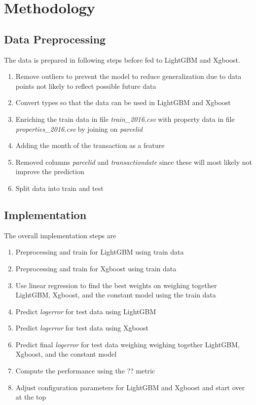 \documentclass[a4paper]{article}
\begin{document}
\section{Methodology}

\subsection{Data Preprocessing}
The data is prepared in following steps before fed to LightGBM and Xgboost.
\begin{enumerate}
    \item Remove outliers to prevent the model to reduce generalization due to data points not likely to
        reflect possible future data
    \item Convert types so that the data can be used in LightGBM and Xgboost
    \item Enriching the train data in file \textit{train\_2016.csv} with property data in file
        \textit{properties\_2016.csv} by joining on \textit{parcelid}
    \item Adding the month of the transaction as a feature
    \item Removed columns \textit{parcelid} and \textit{transactiondate} since these will most likely not
        improve the prediction
    \item Split data into train and test
\end{enumerate}

\subsection{Implementation}
The overall implementation steps are
\begin{enumerate}
    \item Preprocessing and train for LightGBM using train data
    \item Preprocessing and train for Xgboost using train data
    \item Use linear regression to find the best weights on weighing together LightGBM, Xgboost, and the constant
        model using the train data
    \item Predict \textit{logerror} for test data using LightGBM
    \item Predict \textit{logerror} for test data using Xgboost
    \item Predict final \textit{logerror} for test data weighing weighing together LightGBM, Xgboost, and the
        constant model
    \item Compute the performance using the ?? metric
    \item Adjust configuration parameters for LightGBM and Xgboost and start over at the top
\end{enumerate}
\end{document}

